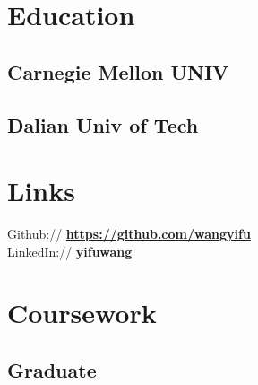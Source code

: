 \documentclass[letterpaper]{deedy-resume} %
\begin{document}
\begin{minipage}[t]{0.33\textwidth} %


\section{Education} 

\subsection{Carnegie Mellon UNIV}


\sectionspace %

\subsection{Dalian Univ of Tech}


\sectionspace %


\section{Links} 

Github:// \href{https://github.com/wangyifu}{\bf https://github.com/wangyifu} \\
LinkedIn:// \href{https://www.linkedin.com/in/yifuwang}{\bf yifuwang} \
\
\sectionspace %


\section{Coursework}

\subsection{Graduate}


\end{minipage}
\end{document}
